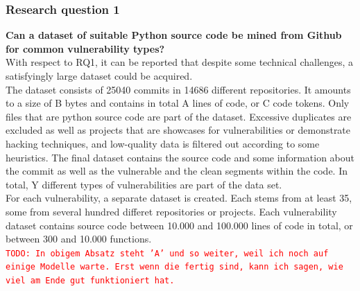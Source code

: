 \documentclass[
a4paper,
pagesize,
pdftex,
12pt,
twoside, %
BCOR=5mm, %
ngerman,
fleqn,
final,
]{scrartcl}
\begin{document}
	\subsubsection{Research question 1}
	\textbf{Can a dataset of suitable Python source code be mined from Github for common vulnerability types?}\\
	With respect to RQ1, it can be reported that despite some technical challenges, a satisfyingly large dataset could be acquired.\\
	The dataset consists of 25040 commits in 14686 different repositories. It amounts to a size of B bytes and contains in total A lines of code, or C code tokens. Only files that are python source code are part of the dataset. Excessive duplicates are excluded as well as projects that are showcases for vulnerabilities or demonstrate hacking techniques, and low-quality data is filtered out according to some heuristics. The final dataset contains the source code and some information about the commit as well as the vulnerable and the clean segments within the code. In total, Y different types of vulnerabilities are part of the data set.\\
	For each vulnerability, a separate dataset is created. Each stems from at least 35, some from several hundred differet repositories or projects. Each vulnerability dataset contains source code between 10.000 and 100.000 lines of code in total, or between 300 and 10.000 functions.\\ %
	
	
	\textcolor{red}{\texttt{TODO: In obigem Absatz steht 'A' und so weiter, weil ich noch auf einige Modelle warte. Erst wenn die fertig sind, kann ich sagen, wie viel am Ende gut funktioniert hat.}}
	
	
\end{document}
